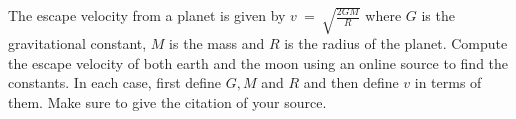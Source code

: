 {The escape velocity from a planet is given by $v~=~\sqrt{\displaystyle\frac{2GM}{R}}$ where $G$ is the gravitational constant, $M$ is the mass and $R$ is the radius of the planet.  Compute the escape velocity of both earth and the moon using an online source to find the constants.  In each case, first define $G,M$ and $R$ and then define $v$ in terms of them.  Make sure to give the citation of your source.}
{}
